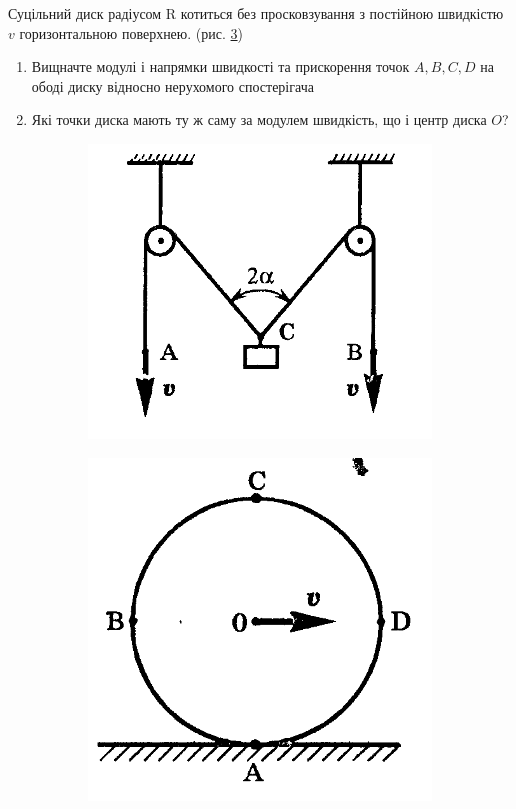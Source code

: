 \begin{problem}{6}
	Суцільний диск радіусом R котиться без просковзування з постійною швидкістю $v$ горизонтальною поверхнею. (рис. \ref{day1p0})
	\begin{enumerate}
		\item Вищначте модулі і напрямки швидкості та прискорення точок $A, B, C, D$ на ободі диску відносно нерухомого спостерігача
		\item Які точки диска мають ту ж саму за модулем швидкість, що і центр диска $O$?
	\end{enumerate}

\begin{figure}[h!]
	\centering
	\begin{subfigure}{.4\textwidth}
		\centering
		\includegraphics[width=.5\textwidth]{class3/blocks.png}
		\caption{}
		\label{day1p00}
	\end{subfigure}
	\begin{subfigure}{.4\textwidth}
		\centering
		\includegraphics[width=.5\textwidth]{class3/round.png}
		\caption{}
		\label{day1p0}
	\end{subfigure}
	\caption{}
\end{figure}
\end{problem}

